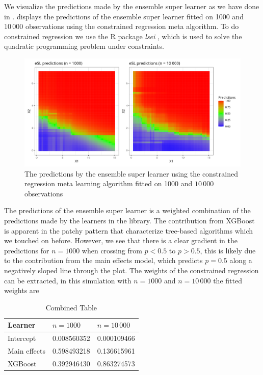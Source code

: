 \documentclass[./main.tex]{subfiles}
\begin{document}
We visualize the predictions made by the ensemble super learner as we have done in .  displays the predictions of the ensemble super learner fitted on 1000 and $ 10\,000 $ observations using the constrained regression meta algorithm. To do constrained regression we use the R package \textit{lsei} \parencite{lsei}, which is used to solve the quadratic programming problem under constraints.  
\begin{figure}[H]
    \centering
    \includegraphics[width=\textwidth]{figures/esl_preds_par.png}
    \caption{The predictions by the ensemble super learner using the constrained regression meta learning algorithm fitted on 1000 and $ 10\,000 $ observations}
    \label{fig:esl_preds_quad_prog}
\end{figure}
The predictions of the ensemble super learner is a weighted combination of the predictions made by the learners in the library. The contribution from XGBoost is apparent in the patchy pattern that characterize tree-based algorithms which we touched on before. However, we see that there is a clear gradient in the predictions for $ n = 1000 $ when crossing from $ p < 0.5 $ to $ p > 0.5 $, this is likely due to the contribution from the main effects model, which predicts $ p = 0.5 $ along a negatively sloped line through the plot. The weights of the constrained regression can be extracted, in this simulation with $ n = 1000 $ and $ n = 10\,000 $ the fitted weights are
\begin{table}[H]
\centering
\begin{tabular}{lll}
\hline
Learner & $ n = 1000 $ & $ n = 10\,000 $\\
\hline
Intercept & 0.008560352 & 0.000109466 \\
Main effects & 0.598493218 & 0.136615961 \\
XGBoost & 0.392946430 & 0.863274573 \\
\hline
\end{tabular}
\caption{Combined Table}
\end{table}
\end{document}
